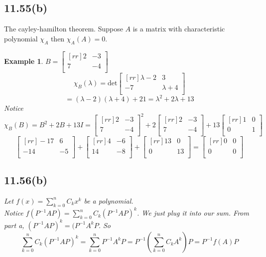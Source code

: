 \documentclass{report}
\newtheorem*{ex}{Example}
\begin{document}
\subsection{11.55(b)}
The cayley-hamilton theorem. Suppose $A$ is a matrix with characteristic polynomial $\chi_A$ then $\chi_A(A)=0$.\\
\begin{ex}
$B=\begin{bmatrix}[rr]2&-3\\7&-4\\\end{bmatrix}$
\[ \chi_B(\lambda )=\mathrm{det}\begin{bmatrix}[rr]\lambda -2&3\\-7&\lambda + 4\\\end{bmatrix} \]
\[ =(\lambda - 2)(\lambda + 4)+21=\lambda^2+2\lambda + 13 \]
Notice $\chi_B(B)=B^2+2B+13I = \begin{bmatrix}[rr]2&-3\\7&-4\\\end{bmatrix}^2+2\begin{bmatrix}[rr]2&-3\\7&-4\\\end{bmatrix}+13\begin{bmatrix}[rr]1&0\\0&1\\\end{bmatrix}$
\[ \begin{bmatrix}[rr]-17&6\\-14&-5\\\end{bmatrix}+\begin{bmatrix}[rr]4&-6\\14&-8\\\end{bmatrix}+\begin{bmatrix}[rr]13&0\\0&13\\\end{bmatrix}=\begin{bmatrix}[rr]0&0\\0&0\\\end{bmatrix} \]
\subsection{11.56(b)}
Let $f(x)=\sum_{k=0}^nC_kx^k$ be a polynomial.\\
Notice $f(P^{-1}AP)=\sum_{k=0}^nC_k(P^{-1}AP)^k$. We just plug it into our sum. From part a, $(P^{-1}AP)^k=(P^{-1}A^kP$. So
\[ \sum_{k=0}^nC_k(P^{-1}AP)^k = \sum_{k=0}^nP^{-1}A^kP=P^{-1}(\sum_{k=0}^nC_kA^k)P = P^{-1}f(A)P \]

\end{ex}
\end{document}
